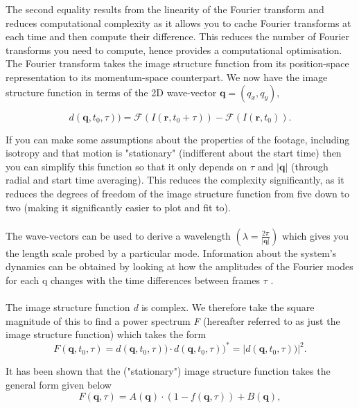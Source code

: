 \documentclass[10pt]{article}
\begin{document}
The second equality results from the linearity of the Fourier transform and reduces computational complexity as it allows you to cache Fourier transforms at each time and then compute their difference.
This reduces the number of Fourier transforms you need to compute, hence provides a computational optimisation.\cite{ddm2}
The Fourier transform takes the image structure function from its position-space representation to its momentum-space counterpart. We now have the image structure function in terms of the 2D wave-vector $\textbf{q} =  (q_x, q_y)$,

\begin{equation}
    d(\textbf{q}, t_0, \tau) ) = \mathscr{F}(I(\mathbf{r}, t_0 + \tau)) - \mathscr{F}(I(\mathbf{r}, t_0)).
\end{equation}

If you can make some assumptions about the properties of the footage, including isotropy and that motion is "stationary" (indifferent about the start time) \cite{ddm1} then you can simplify this function so that it only depends on $\tau$ and $|\textbf{q}|$ (through radial and start time averaging). This reduces the complexity significantly, as it reduces the degrees of freedom of the image structure function from five down to two (making it significantly easier to plot and fit to).
\\\\
The wave-vectors can be used to derive a wavelength $(\lambda = \frac{2\pi}{|\textbf{q}|})$ which gives you the length scale probed by a particular mode.
Information about the system's dynamics can be obtained by looking at how the amplitudes of the Fourier modes for each q changes with the time differences between frames $\tau$ \cite{ddm2}.
\\\\
The image structure function \textit{d} is complex. We therefore take the square magnitude of this to find a power spectrum \textit{F} (hereafter referred to as just the image structure function) which takes the form
\begin{equation}
F(\textbf{q}, t_0, \tau) = d(\textbf{q}, t_0, \tau)) \cdot d(\textbf{q}, t_0, \tau) )^{*} = |d(\textbf{q}, t_0, \tau) )|^2.
\end{equation}

It has been shown that the ("stationary") image structure function takes the general form given below \cite{ddm1}
\begin{equation}
\label{eqn:power_spectrum}
	F(\textbf{q}, \tau) = A(\textbf{q}) \cdot (1 - f(\textbf{q}, \tau)) + B(\textbf{q}),
\end{equation}
\end{document}
